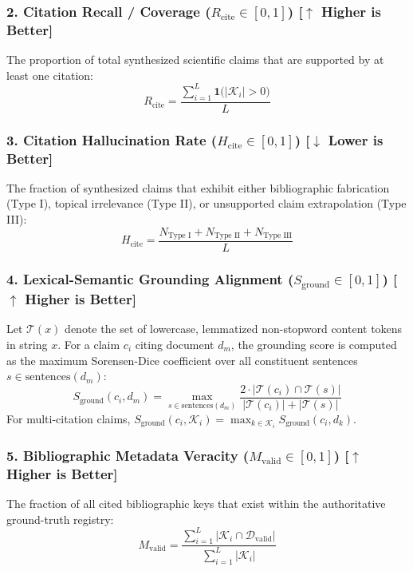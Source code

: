 \documentclass[acmsmall,screen]{acmart}
\begin{document}
\subsubsection{2. Citation Recall / Coverage ($R_{\text{cite}} \in [0, 1]$) [$\uparrow$ Higher is Better]}
The proportion of total synthesized scientific claims that are supported by at least one citation:
\begin{equation}
R_{\text{cite}} = \frac{\sum_{i=1}^{L} \mathbf{1}\big(|\mathcal{K}_i| > 0\big)}{L}
\end{equation}

\subsubsection{3. Citation Hallucination Rate ($H_{\text{cite}} \in [0, 1]$) [$\downarrow$ Lower is Better]}
The fraction of synthesized claims that exhibit either bibliographic fabrication (Type I), topical irrelevance (Type II), or unsupported claim extrapolation (Type III):
\begin{equation}
H_{\text{cite}} = \frac{N_{\text{Type I}} + N_{\text{Type II}} + N_{\text{Type III}}}{L}
\end{equation}

\subsubsection{4. Lexical-Semantic Grounding Alignment ($S_{\text{ground}} \in [0, 1]$) [$\uparrow$ Higher is Better]}
Let $\mathcal{T}(x)$ denote the set of lowercase, lemmatized non-stopword content tokens in string $x$. For a claim $c_i$ citing document $d_m$, the grounding score is computed as the maximum Sorensen-Dice coefficient over all constituent sentences $s \in \text{sentences}(d_m)$:
\begin{equation}
S_{\text{ground}}(c_i, d_m) = \max_{s \in \text{sentences}(d_m)} \frac{2 \cdot |\mathcal{T}(c_i) \cap \mathcal{T}(s)|}{|\mathcal{T}(c_i)| + |\mathcal{T}(s)|}
\end{equation}
For multi-citation claims, $S_{\text{ground}}(c_i, \mathcal{K}_i) = \max_{k \in \mathcal{K}_i} S_{\text{ground}}(c_i, d_k)$.

\subsubsection{5. Bibliographic Metadata Veracity ($M_{\text{valid}} \in [0, 1]$) [$\uparrow$ Higher is Better]}
The fraction of all cited bibliographic keys that exist within the authoritative ground-truth registry:
\begin{equation}
M_{\text{valid}} = \frac{\sum_{i=1}^L |\mathcal{K}_i \cap \mathcal{D}_{\text{valid}}|}{\sum_{i=1}^L |\mathcal{K}_i|}
\end{equation}
\end{document}
